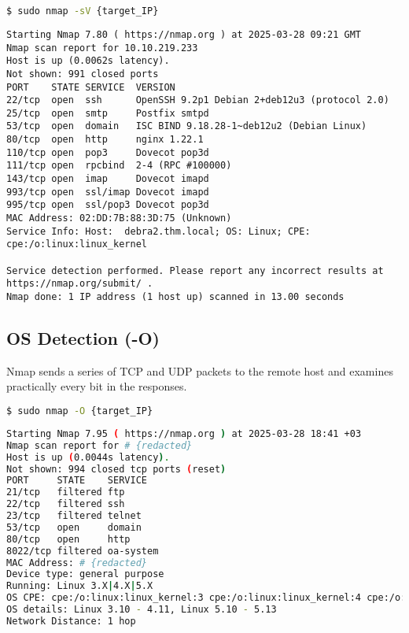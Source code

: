 \documentclass[11pt,a4paper]{article}
\newenvironment{commandbox}[1][]{
    \begin{tcolorbox}[
        colback=kalibackground,   
        colframe=commandcolor,    
        fonttitle=\bfseries\color{white},  
        title=#1,               
        breakable=true           
    ]
}{
    \end{tcolorbox}
}
\begin{document}
\clearpage

\begin{commandbox}[Service Version Detection for Comparison]
\begin{lstlisting}[language=bash, basicstyle=\small\ttfamily\color{warningcolor}]
$ sudo nmap -sV {target_IP}
\end{lstlisting}

\begin{lstlisting}[basicstyle=\small\ttfamily\color{kalitext}]
Starting Nmap 7.80 ( https://nmap.org ) at 2025-03-28 09:21 GMT
Nmap scan report for 10.10.219.233
Host is up (0.0062s latency).
Not shown: 991 closed ports
PORT    STATE SERVICE  VERSION
22/tcp  open  ssh      OpenSSH 9.2p1 Debian 2+deb12u3 (protocol 2.0)
25/tcp  open  smtp     Postfix smtpd
53/tcp  open  domain   ISC BIND 9.18.28-1~deb12u2 (Debian Linux)
80/tcp  open  http     nginx 1.22.1
110/tcp open  pop3     Dovecot pop3d
111/tcp open  rpcbind  2-4 (RPC #100000)
143/tcp open  imap     Dovecot imapd
993/tcp open  ssl/imap Dovecot imapd
995/tcp open  ssl/pop3 Dovecot pop3d
MAC Address: 02:DD:7B:88:3D:75 (Unknown)
Service Info: Host:  debra2.thm.local; OS: Linux; CPE: cpe:/o:linux:linux_kernel

Service detection performed. Please report any incorrect results at https://nmap.org/submit/ .
Nmap done: 1 IP address (1 host up) scanned in 13.00 seconds
\end{lstlisting}
\end{commandbox}


\subsection{OS Detection (-O)}

Nmap sends a series of TCP and UDP packets to the remote host and examines practically every bit in the responses.

\begin{commandbox}[OS Detection Scan]
\begin{lstlisting}[language=bash, style=bash, basicstyle=\small\ttfamily\color{warningcolor}]
$ sudo nmap -O {target_IP}
\end{lstlisting}

\begin{lstlisting}[basicstyle=\small\ttfamily\color{kalitext}, language=bash, style=bash]
Starting Nmap 7.95 ( https://nmap.org ) at 2025-03-28 18:41 +03
Nmap scan report for # {redacted}
Host is up (0.0044s latency).
Not shown: 994 closed tcp ports (reset)
PORT     STATE    SERVICE
21/tcp   filtered ftp
22/tcp   filtered ssh
23/tcp   filtered telnet
53/tcp   open     domain
80/tcp   open     http
8022/tcp filtered oa-system
MAC Address: # {redacted}
Device type: general purpose
Running: Linux 3.X|4.X|5.X
OS CPE: cpe:/o:linux:linux_kernel:3 cpe:/o:linux:linux_kernel:4 cpe:/o:linux:linux_kernel:5
OS details: Linux 3.10 - 4.11, Linux 5.10 - 5.13
Network Distance: 1 hop
\end{lstlisting}
\end{commandbox}
\clearpage
\end{document}
